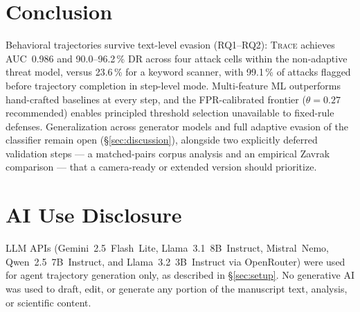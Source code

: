 \documentclass[conference]{IEEEtran}
\begin{document}
\section{Conclusion}
\label{sec:conclusion}

Behavioral trajectories survive text-level evasion (RQ1--RQ2):
\textsc{Trace} achieves AUC~0.986 and 90.0--96.2\,\% DR across four
attack cells within the non-adaptive threat model, versus 23.6\,\%
for a keyword scanner, with 99.1\,\% of attacks flagged before
trajectory completion in step-level mode. Multi-feature ML
outperforms hand-crafted baselines at every step, and the
FPR-calibrated frontier ($\theta{=}0.27$ recommended) enables
principled threshold selection unavailable to fixed-rule defenses.
Generalization across generator models and full adaptive evasion of
the classifier remain open (\S\ref{sec:discussion}), alongside two
explicitly deferred validation steps --- a matched-pairs corpus
analysis and an empirical Zavrak comparison --- that a camera-ready
or extended version should prioritize.




\section*{AI Use Disclosure}
LLM APIs (Gemini~2.5~Flash~Lite, Llama~3.1~8B~Instruct, Mistral~Nemo,
Qwen~2.5~7B~Instruct, and Llama~3.2~3B~Instruct via OpenRouter) were
used for agent trajectory generation only, as described in
\S\ref{sec:setup}. No generative AI was used to draft, edit, or
generate any portion of the manuscript text, analysis, or scientific
content.
\end{document}
